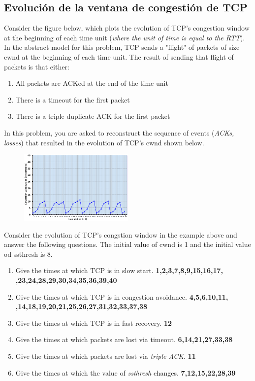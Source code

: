 \subsection*{Evoluci\'on de la ventana de congesti\'on de TCP}
\noindent Consider the figure below, which plots the evolution of TCP's congestion window at the beginning of each time unit (\textit{where the unit of time is equal to the RTT}).
In the abstract model for this problem, TCP sends a "flight" of packets of size cwnd at the beginning of each time unit. The result of sending that flight of packets is that either:
\begin{enumerate}
    \item All packets are ACKed at the end of the time unit
    \item There is a timeout for the first packet
    \item There is a triple duplicate ACK for the first packet
\end{enumerate} 
\noindent In this problem, you are asked to reconstruct the sequence of events (\textit{ACKs, losses}) that resulted in the evolution of TCP's cwnd shown below.
\begin{figure}
    \centering
    \includegraphics[width=0.5\textwidth]{img/grafica.png}
\end{figure} 
\noindent Consider the evolution of TCP's congstion window in the example above and answer the following questions. The initial value of cwnd is 1 and the initial
value od ssthresh is 8.
\begin{enumerate}
    \item Give the times at which TCP is in slow start. \textbf{1,2,3,7,8,9,15,16,17,
    ,23,24,28,29,30,34,35,36,39,40}
    \item Give the times at which TCP is in congestion avoidance. \textbf{4,5,6,10,11,
    ,14,18,19,20,21,25,26,27,31,32,33,37,38}
    \item Give the times at which TCP is in fast recovery. \textbf{12}
    \item Give the times at which packets are lost via timeout. \textbf{6,14,21,27,33,38}
    \item Give the times at which packets are lost via \textit{triple ACK}. \textbf{11}
    \item Give the times at which the value of \textit{ssthresh} changes. \textbf{7,12,15,22,28,39} 
\end{enumerate}

